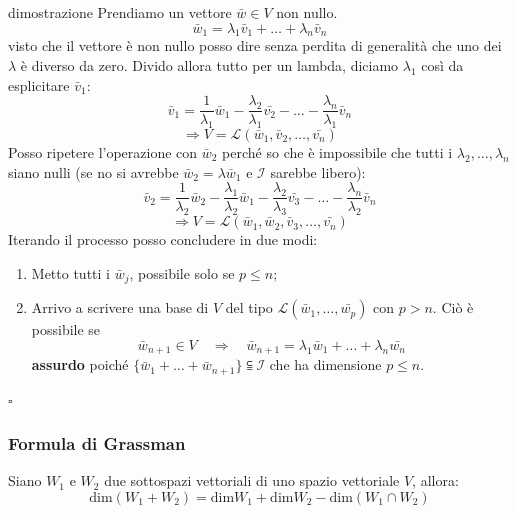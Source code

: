 \documentclass[x11names]{article}
\newcommand*{\QEDB}{\null\nobreak\hfill\ensuremath{\square}}%
\begin{document}
\begin{es}{dimostrazione}
	Prendiamo un vettore $\bar{w} \in V$ non nullo.
	\[
	\bar{w}_{1}  = \lambda_1 \bar{v}_{1} + \dots + \lambda_n \bar{v}_{n}
	\]
	visto che il vettore è non nullo posso dire senza perdita di generalità che uno dei $\lambda$ è diverso da zero. Divido allora tutto per un lambda, diciamo $\lambda_1$ così da esplicitare $\bar{v}_{1}$:
	\[
	\bar{v}_{1} = \frac{1}{\lambda_1}\bar{w}_{1} - \frac{\lambda_{2}}{\lambda_{1}}\bar{v_{2}} - \dots - \frac{\lambda_{n}}{\lambda_{1}}\bar{v}_{n}
	\] 
	\[
	\Longrightarrow V = \mathcal{L}\left(\bar{w}_{1},\bar{v}_{2},\dots,\bar{v_{n}}\right)
	\]
	Posso ripetere l'operazione con $\bar{w}_{2}$ perché so che è impossibile che tutti i $\lambda_{2}, \dots , \lambda_{n}$ siano nulli (se no si avrebbe $\bar{w}_{2} = \lambda \bar{w}_{1}$ e $\mathcal{I}$ sarebbe libero):
	\[
	\bar{v}_{2} = \frac{1}{\lambda_2}\bar{w}_{2} - \frac{\lambda_{1}}{\lambda_2}\bar{w}_{1} - \frac{\lambda_{2}}{\lambda_{3}}\bar{v_{3}} - \dots - \frac{\lambda_{n}}{\lambda_{2}}\bar{v}_{n}
	\]
	\[
	\Longrightarrow V =  \mathcal{L}\left(\bar{w}_{1},\bar{w}_{2},\bar{v}_{3},\dots,\bar{v_{n}}\right)
	\]
	Iterando il processo posso concludere in due modi:
	\begin{enumerate}
		\item Metto tutti i $\bar{w}_{j}$, possibile solo se $p \leq n$;
		\item Arrivo a scrivere una base di $V$ del tipo $\mathcal{L}\left(\bar{w}_{1},\dots,\bar{w_{p}}\right)$ con $p > n$. Ciò è possibile se 
		\[
		\bar{w}_{n+1} \in V \quad \Longrightarrow \quad \bar{w}_{n+1}  = \lambda_{1}\bar{w}_{1} + \dots + \lambda_{n}\bar{w_{n}}
		\]
		\textbf{assurdo} poiché $\{\bar{w}_{1} + \dots + \bar{w}_{n+1}\} \subseteqq \mathcal{I}$ che ha dimensione $p \leq n$.
	\end{enumerate} \QEDB
\end{es}


				\subsubsection{Formula di Grassman}
				Siano $W_{1}$ e $W_{2}$ due sottospazi vettoriali di uno spazio vettoriale $V$, allora:
				\[
				\text{dim}\left(W_{1} + W_{2}\right) = \text{dim}W_{1} + \text{dim}W_{2} - \text{dim}\left(W_{1} \cap W_{2}\right)
				\]
\end{document}
